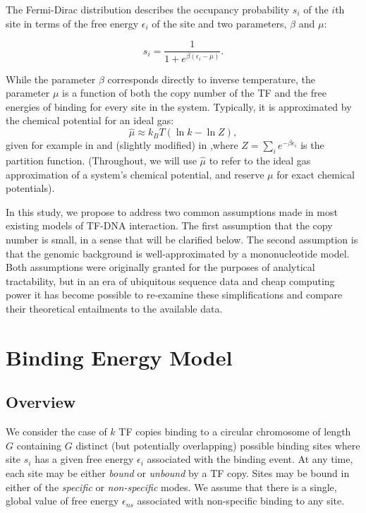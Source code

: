 \documentclass{article}
\begin{document}
The Fermi-Dirac distribution describes the occupancy probability $s_i$
of the $i$th site in terms of the free energy $\epsilon_i$ of the site
and two parameters, $\beta$ and $\mu$:

\begin{equation}
  \label{eq:s_fd}
  s_i = \frac{1}{1 + e^{\beta(\epsilon_i - \mu)}}.
\end{equation}

While the parameter $\beta$ corresponds directly to inverse
temperature, the parameter $\mu$ is a function of both the copy number
of the TF and the free energies of binding for every site in the
system.  Typically, it is approximated by the chemical potential for an ideal gas:
\begin{equation}
  \label{eq:mu_approx}
  \hat{\mu} \approx k_BT (\ln k - \ln Z),
\end{equation}
given for example in \cite{gerland02} and (slightly modified) in
\cite{zhao09},where $Z=\sum_ie^{-\beta\epsilon_i}$ is the partition
function.  (Throughout, we will use $\hat\mu$ to refer to the ideal
gas approximation of a system's chemical potential, and reserve $\mu$
for exact chemical potentials).

In this study, we propose to address two common assumptions made in
most existing models of TF-DNA interaction.  The first assumption that
the copy number is small, in a sense that will be clarified below.
The second assumption is that the genomic background is
well-approximated by a mononucleotide model.  Both assumptions were
originally granted for the purposes of analytical tractability, but in
an era of ubiquitous sequence data and cheap computing power it has
become possible to re-examine these simplifications and compare their
theoretical entailments to the available data.

\section{Binding Energy Model}
\subsection{Overview}
We consider the case of $k$ TF copies binding to a circular chromosome
of length $G$ containing $G$ distinct (but potentially overlapping)
possible binding sites where site $s_i$ has a given free energy
$\epsilon_i $ associated with the binding event.  At any time, each
site may be either \textit{bound} or \textit{unbound} by a TF copy.
Sites may be bound in either of the \textit{specific} or
\textit{non-specific} modes.  We assume that there is a single, global
value of free energy $\epsilon_{ns}$ associated with non-specific
binding to any site.
\end{document}
